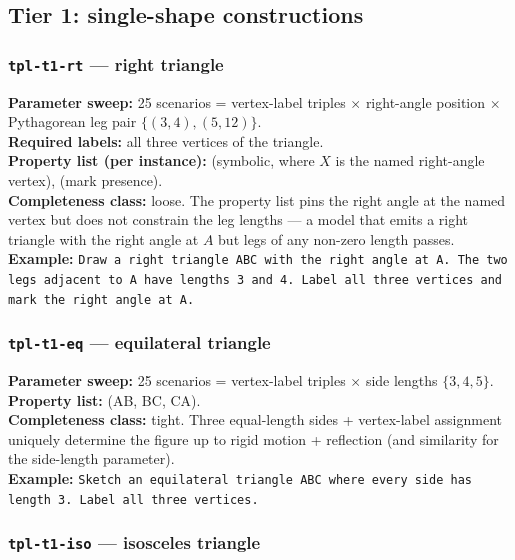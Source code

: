 \subsection{Tier 1: single-shape constructions}

\subsubsection{\texttt{tpl-t1-rt} --- right triangle}

\textbf{Parameter sweep:} 25 scenarios = vertex-label triples $\times$ right-angle position $\times$ Pythagorean leg pair $\{(3,4), (5,12)\}$.\\
\textbf{Required labels:} all three vertices of the triangle.\\
\textbf{Property list (per instance):}  (symbolic, where $X$ is the named right-angle vertex),  (mark presence).\\
\textbf{Completeness class:} loose. The property list pins the right angle at the named vertex but does not constrain the leg lengths --- a model that emits a right triangle with the right angle at $A$ but legs of any non-zero length passes.\\
\textbf{Example:} \texttt{Draw a right triangle ABC with the right angle at A. The two legs adjacent to A have lengths 3 and 4. Label all three vertices and mark the right angle at A.}

\subsubsection{\texttt{tpl-t1-eq} --- equilateral triangle}

\textbf{Parameter sweep:} 25 scenarios = vertex-label triples $\times$ side lengths $\{3, 4, 5\}$.\\
\textbf{Property list:} (AB, BC, CA).\\
\textbf{Completeness class:} tight. Three equal-length sides + vertex-label assignment uniquely determine the figure up to rigid motion + reflection (and similarity for the side-length parameter).\\
\textbf{Example:} \texttt{Sketch an equilateral triangle ABC where every side has length 3. Label all three vertices.}

\subsubsection{\texttt{tpl-t1-iso} --- isosceles triangle}

